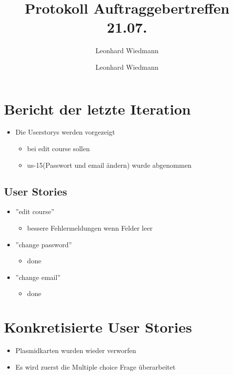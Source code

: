 \documentclass[colorback, accentcolor=tud1c, paper=a4]{tudexercise}
\title{Protokoll Auftraggebertreffen 21.07.}
\subtitle{Leonhard Wiedmann}
\author{Leonhard Wiedmann}
\begin{document}
\maketitle

\begin{multicols}{2}

\section{Bericht der letzte Iteration}
\begin{itemize}
	\item Die Userstorys werden vorgezeigt
	\begin{itemize}
		\item bei edit course sollen
		\item us-15(Passwort und email ändern) wurde abgenommen
	\end{itemize}
\end{itemize}

\subsection{User Stories}
\begin{itemize}
	\item ''edit course''
	\begin{itemize}
		\item bessere Fehlermeldungen wenn Felder leer
	\end{itemize}
	\item ''change password''
	\begin{itemize}
		\item done
	\end{itemize}
	\item ''change email''
	\begin{itemize}
		\item done
	\end{itemize}
\end{itemize}

\section{Konkretisierte User Stories}
\begin{itemize}
	\item Plasmidkarten wurden wieder verworfen
	\item Es wird zuerst die Multiple choice Frage überarbeitet
\end{itemize}


\end{multicols}
\end{document}
